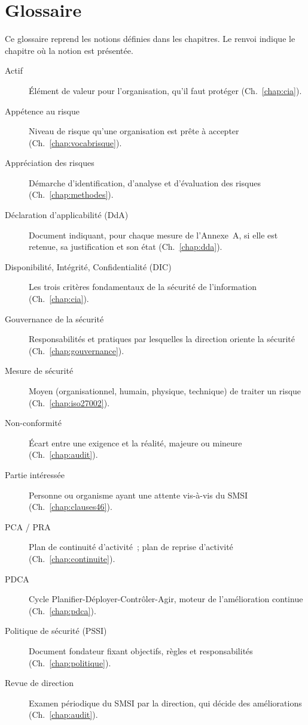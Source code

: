 \chapter{Glossaire}
\label{ann:glossaire}

Ce glossaire reprend les notions définies dans les chapitres. Le renvoi
indique le chapitre où la notion est présentée.

\begin{description}
    \item[Actif] Élément de valeur pour l'organisation, qu'il faut protéger (Ch.~\ref{chap:cia}).
    \item[Appétence au risque] Niveau de risque qu'une organisation est prête à accepter (Ch.~\ref{chap:vocabrisque}).
    \item[Appréciation des risques] Démarche d'identification, d'analyse et d'évaluation des risques (Ch.~\ref{chap:methodes}).
    \item[Déclaration d'applicabilité (DdA)] Document indiquant, pour chaque mesure de l'Annexe~A, si elle est retenue, sa justification et son état (Ch.~\ref{chap:dda}).
    \item[Disponibilité, Intégrité, Confidentialité (DIC)] Les trois critères fondamentaux de la sécurité de l'information (Ch.~\ref{chap:cia}).
    \item[Gouvernance de la sécurité] Responsabilités et pratiques par lesquelles la direction oriente la sécurité (Ch.~\ref{chap:gouvernance}).
    \item[Mesure de sécurité] Moyen (organisationnel, humain, physique, technique) de traiter un risque (Ch.~\ref{chap:iso27002}).
    \item[Non-conformité] Écart entre une exigence et la réalité, majeure ou mineure (Ch.~\ref{chap:audit}).
    \item[Partie intéressée] Personne ou organisme ayant une attente vis-à-vis du SMSI (Ch.~\ref{chap:clauses46}).
    \item[PCA / PRA] Plan de continuité d'activité~; plan de reprise d'activité (Ch.~\ref{chap:continuite}).
    \item[PDCA] Cycle Planifier-Déployer-Contrôler-Agir, moteur de l'amélioration continue (Ch.~\ref{chap:pdca}).
    \item[Politique de sécurité (PSSI)] Document fondateur fixant objectifs, règles et responsabilités (Ch.~\ref{chap:politique}).
    \item[Revue de direction] Examen périodique du SMSI par la direction, qui décide des améliorations (Ch.~\ref{chap:audit}).

\end{description}
